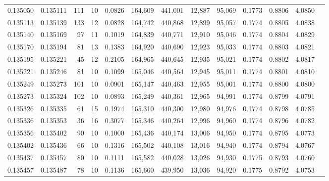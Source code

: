 \begin{tabular}{rrrrrrrrrrrrr}
0.135050 & 0.135111 &   111 &  10 &                                     0.0826 & 164,609 & 441,001 &  12,887 &  95,069 & 0.1773 & 0.8806 & 4.0850 \\
0.135113 & 0.135139 &   133 &  12 &                                     0.0828 & 164,742 & 440,868 &  12,899 &  95,057 & 0.1774 & 0.8805 & 4.0838 \\
0.135140 & 0.135169 &    97 &  11 &                                     0.1019 & 164,839 & 440,771 &  12,910 &  95,046 & 0.1774 & 0.8804 & 4.0829 \\
0.135170 & 0.135194 &    81 &  13 &                                     0.1383 & 164,920 & 440,690 &  12,923 &  95,033 & 0.1774 & 0.8803 & 4.0821 \\
0.135195 & 0.135221 &    45 &  12 &                                     0.2105 & 164,965 & 440,645 &  12,935 &  95,021 & 0.1774 & 0.8802 & 4.0817 \\
0.135221 & 0.135246 &    81 &  10 &                                     0.1099 & 165,046 & 440,564 &  12,945 &  95,011 & 0.1774 & 0.8801 & 4.0810 \\
0.135249 & 0.135273 &   101 &  10 &                                     0.0901 & 165,147 & 440,463 &  12,955 &  95,001 & 0.1774 & 0.8800 & 4.0800 \\
0.135273 & 0.135324 &   102 &  10 &                                     0.0893 & 165,249 & 440,361 &  12,965 &  94,991 & 0.1774 & 0.8799 & 4.0791 \\
0.135326 & 0.135335 &    61 &  15 &                                     0.1974 & 165,310 & 440,300 &  12,980 &  94,976 & 0.1774 & 0.8798 & 4.0785 \\
0.135336 & 0.135353 &    36 &  16 &                                     0.3077 & 165,346 & 440,264 &  12,996 &  94,960 & 0.1774 & 0.8796 & 4.0782 \\
0.135356 & 0.135402 &    90 &  10 &                                     0.1000 & 165,436 & 440,174 &  13,006 &  94,950 & 0.1774 & 0.8795 & 4.0773 \\
0.135402 & 0.135436 &    66 &  10 &                                     0.1316 & 165,502 & 440,108 &  13,016 &  94,940 & 0.1774 & 0.8794 & 4.0767 \\
0.135437 & 0.135457 &    80 &  10 &                                     0.1111 & 165,582 & 440,028 &  13,026 &  94,930 & 0.1775 & 0.8793 & 4.0760 \\
0.135457 & 0.135487 &    78 &  10 &                                     0.1136 & 165,660 & 439,950 &  13,036 &  94,920 & 0.1775 & 0.8792 & 4.0753 \\

\end{tabular}
